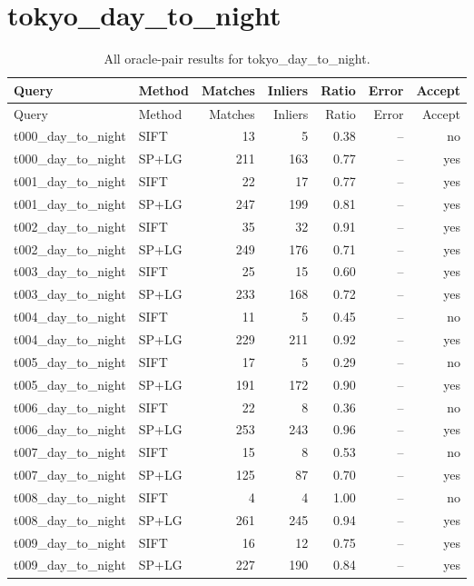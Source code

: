\section{tokyo\_day\_to\_night}
\begingroup\scriptsize\setlength{\tabcolsep}{3pt}
\begin{longtable}{llrrrrr}
\caption{All oracle-pair results for tokyo\_day\_to\_night.}\\
\toprule
Query & Method & Matches & Inliers & Ratio & Error & Accept\\\midrule\endfirsthead
\toprule Query & Method & Matches & Inliers & Ratio & Error & Accept\\\midrule\endhead
\bottomrule\endfoot
t000\_day\_to\_night & SIFT & 13 & 5 & 0.38 & -- & no \\
t000\_day\_to\_night & SP+LG & 211 & 163 & 0.77 & -- & yes \\
t001\_day\_to\_night & SIFT & 22 & 17 & 0.77 & -- & yes \\
t001\_day\_to\_night & SP+LG & 247 & 199 & 0.81 & -- & yes \\
t002\_day\_to\_night & SIFT & 35 & 32 & 0.91 & -- & yes \\
t002\_day\_to\_night & SP+LG & 249 & 176 & 0.71 & -- & yes \\
t003\_day\_to\_night & SIFT & 25 & 15 & 0.60 & -- & yes \\
t003\_day\_to\_night & SP+LG & 233 & 168 & 0.72 & -- & yes \\
t004\_day\_to\_night & SIFT & 11 & 5 & 0.45 & -- & no \\
t004\_day\_to\_night & SP+LG & 229 & 211 & 0.92 & -- & yes \\
t005\_day\_to\_night & SIFT & 17 & 5 & 0.29 & -- & no \\
t005\_day\_to\_night & SP+LG & 191 & 172 & 0.90 & -- & yes \\
t006\_day\_to\_night & SIFT & 22 & 8 & 0.36 & -- & no \\
t006\_day\_to\_night & SP+LG & 253 & 243 & 0.96 & -- & yes \\
t007\_day\_to\_night & SIFT & 15 & 8 & 0.53 & -- & no \\
t007\_day\_to\_night & SP+LG & 125 & 87 & 0.70 & -- & yes \\
t008\_day\_to\_night & SIFT & 4 & 4 & 1.00 & -- & no \\
t008\_day\_to\_night & SP+LG & 261 & 245 & 0.94 & -- & yes \\
t009\_day\_to\_night & SIFT & 16 & 12 & 0.75 & -- & yes \\
t009\_day\_to\_night & SP+LG & 227 & 190 & 0.84 & -- & yes \\

\end{longtable}
